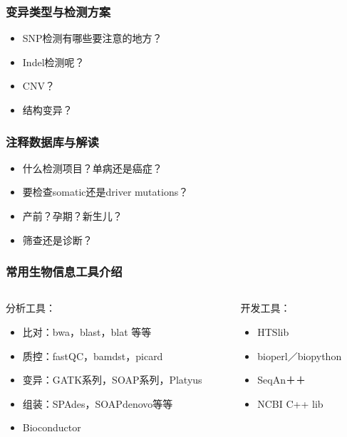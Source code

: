\documentclass[12pt]{beamer}
\begin{document}
\begin{frame}\frametitle{变异类型与检测方案}
\begin{itemize}
\item SNP检测有哪些要注意的地方？
\item Indel检测呢？
\item CNV？
\item 结构变异？
\end{itemize}
\end{frame}

\begin{frame}\frametitle{注释数据库与解读}
  \begin{itemize}
\item 什么检测项目？单病还是癌症？
\item 要检查somatic还是driver mutations？
\item 产前？孕期？新生儿？
\item 筛查还是诊断？  
\end{itemize}

\end{frame}
\begin{frame}\frametitle{常用生物信息工具介绍}
  \begin{columns}
    \begin{column}{0.5\textwidth}
      分析工具：
      \begin{itemize}
      \item 比对：bwa，blast，blat 等等
      \item 质控：fastQC，bamdst，picard
      \item 变异：GATK系列，SOAP系列，Platyus
      \item 组装：SPAdes，SOAPdenovo等等
      \item Bioconductor
      \end{itemize}
    \end{column}

    \begin{column}{0.5\textwidth}
      开发工具：
      \begin{itemize}
      \item HTSlib
      \item bioperl／biopython
      \item SeqAn＋＋
      \item NCBI C++ lib
      \end{itemize}
    \end{column}
    
    \end{columns}
  
  \end{frame}
\end{document}
